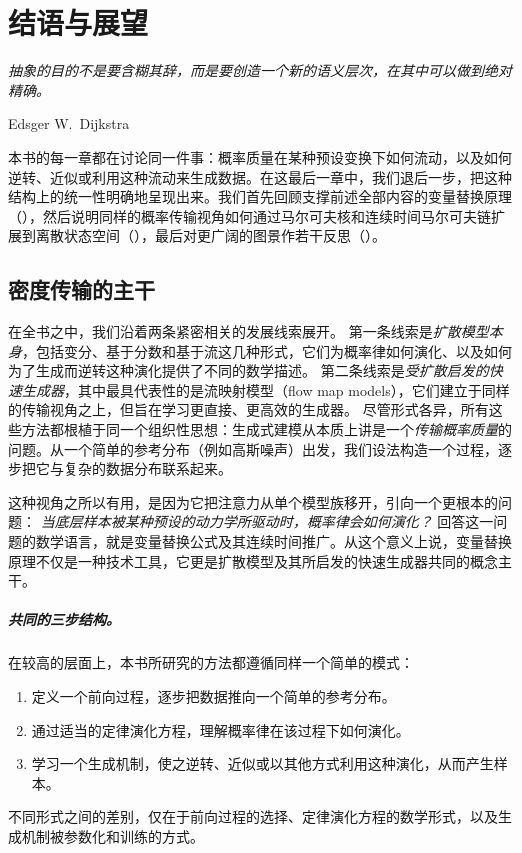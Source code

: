 \chapter{结语与展望}\label{ch:epilogue}

\epigraph{\textit{抽象的目的不是要含糊其辞，而是要创造一个新的语义层次，在其中可以做到绝对精确。}}{Edsger W.\ Dijkstra}

本书的每一章都在讨论同一件事：概率质量在某种预设变换下如何流动，以及如何逆转、近似或利用这种流动来生成数据。在这最后一章中，我们退后一步，把这种结构上的统一性明确地呈现出来。我们首先回顾支撑前述全部内容的变量替换原理（），然后说明同样的概率传输视角如何通过马尔可夫核和连续时间马尔可夫链扩展到离散状态空间（），最后对更广阔的图景作若干反思（）。

\clearpage
\newpage

\section{密度传输的主干}\label{sec:epilogue-backbone}

在全书之中，我们沿着两条紧密相关的发展线索展开。
第一条线索是\emph{扩散模型本身}，包括变分、基于分数和基于流这几种形式，它们为概率律如何演化、以及如何为了生成而逆转这种演化提供了不同的数学描述。
第二条线索是\emph{受扩散启发的快速生成器}，其中最具代表性的是流映射模型（flow map models），它们建立于同样的传输视角之上，但旨在学习更直接、更高效的生成器。
尽管形式各异，所有这些方法都根植于同一个组织性思想：生成式建模从本质上讲是一个\emph{传输概率质量}的问题。从一个简单的参考分布（例如高斯噪声）出发，我们设法构造一个过程，逐步把它与复杂的数据分布联系起来。

这种视角之所以有用，是因为它把注意力从单个模型族移开，引向一个更根本的问题：
\emph{当底层样本被某种预设的动力学所驱动时，概率律会如何演化？}
回答这一问题的数学语言，就是变量替换公式及其连续时间推广。从这个意义上说，变量替换原理不仅是一种技术工具，它更是扩散模型及其所启发的快速生成器共同的概念主干。

\paragraph{共同的三步结构。}
在较高的层面上，本书所研究的方法都遵循同样一个简单的模式：
\begin{enumerate}[leftmargin=2em]
    \item 定义一个前向过程，逐步把数据推向一个简单的参考分布。
    \item 通过适当的定律演化方程，理解概率律在该过程下如何演化。
    \item 学习一个生成机制，使之逆转、近似或以其他方式利用这种演化，从而产生样本。
\end{enumerate}
不同形式之间的差别，仅在于前向过程的选择、定律演化方程的数学形式，以及生成机制被参数化和训练的方式。

